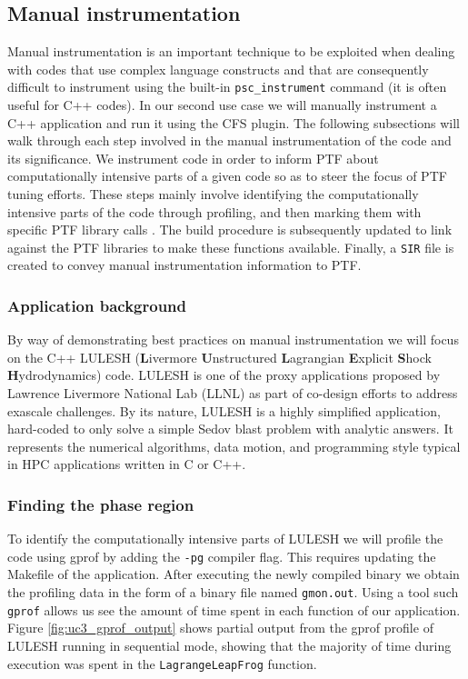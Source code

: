 \subsection{Manual instrumentation}
Manual instrumentation is an important technique to be exploited when dealing with codes that use complex language constructs and that are consequently difficult to instrument using the built-in {\tt psc\_instrument} command (it is often useful for C++ codes). In our second use case we will manually instrument a C++ application and run it using the CFS plugin. The following subsections will walk through each step involved in the manual instrumentation of the code and its significance. We instrument code in order to inform PTF about computationally intensive parts of a given code so as to steer the focus of PTF  tuning efforts. These steps mainly involve identifying the computationally intensive parts of the code through profiling, and then marking them with specific PTF library calls . The build procedure is subsequently updated to link against the PTF libraries to make these functions available. Finally, a {\tt SIR} file is created to convey manual instrumentation information to PTF.

\subsubsection{Application background}
By way of demonstrating best practices on manual instrumentation we will focus on the C++ LULESH (\textbf{L}ivermore \textbf{U}nstructured \textbf{L}agrangian \textbf{E}xplicit \textbf{S}hock \textbf{H}ydrodynamics) \cite{LULESH} code. LULESH is one of the proxy applications proposed by Lawrence Livermore National Lab (LLNL) as part of co-design efforts to address exascale challenges. By its nature, LULESH is a highly simplified application, hard-coded to only solve a simple Sedov blast problem with analytic answers. It represents the numerical algorithms, data motion, and programming style typical in HPC applications written in C or C++.

\subsubsection{Finding the phase region}

To identify the computationally intensive parts of LULESH we will profile the code using gprof by adding the {\tt -pg} compiler flag. This requires updating the Makefile of the application. After executing the newly compiled binary we obtain the profiling data in the form of a binary file named {\tt gmon.out}. Using a tool such {\tt gprof} allows us see the amount of time spent in each function of our application. Figure \ref{fig:uc3_gprof_output} shows partial output from the gprof profile of LULESH running in sequential mode, showing that the majority of time during execution was spent in the {\tt LagrangeLeapFrog} function.
	
